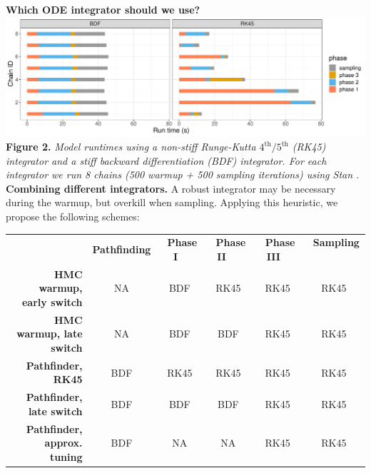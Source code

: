 \documentclass[21pt, custom, portrait, plainboxedsections]{sciposter}
\begin{document}
\begin{multicols}{3}
\textbf{Which ODE integrator should we use?} \\

\includegraphics[width = 14.5in]{../figures/phase_time_facet_4x12.pdf}
\textbf{Figure 2.} \textit{Model runtimes using a non-stiff Runge-Kutta $4^\text{th}/5^\text{th}$ (RK45) integrator and a stiff backward differentiation (BDF) integrator.
For each integrator we run 8 chains (500 warmup + 500 sampling iterations) using Stan \cite{Stan:2021}.} \\


\textbf{Combining different integrators.} A robust integrator may be necessary during the warmup, but overkill when sampling.
Applying this heuristic, we propose the following schemes:

\begin{center}
\renewcommand{\arraystretch}{1.5}
\begin{tabular}{r c c c c c}
  & \textbf{Pathfinding} & \ \textbf{Phase I} \ & \ \textbf{Phase II} \ \ & \ \textbf{Phase III} \ & \ \textbf{Sampling} \ \\
  \textbf{HMC warmup, early switch} & NA & \cellcolor{Melon} BDF & \cellcolor{SkyBlue} RK45 & \cellcolor{SkyBlue} RK45 & \cellcolor{SkyBlue} RK45 \\
  \textbf{HMC warmup, late switch} & NA & \cellcolor{Melon} BDF & \cellcolor{Melon} BDF &  \cellcolor{SkyBlue} RK45 & \cellcolor{SkyBlue} RK45 \\
  \hline
  \textbf{Pathfinder, RK45} & \cellcolor{Melon} BDF  & \cellcolor{SkyBlue} RK45 & \cellcolor{SkyBlue} RK45 & \cellcolor{SkyBlue} RK45 & \cellcolor{SkyBlue} RK45 \\
  \textbf{Pathfinder, late switch} & \cellcolor{Melon} BDF & \cellcolor{Melon} BDF & \cellcolor{Melon} BDF & \cellcolor{SkyBlue} RK45 & \cellcolor{SkyBlue} RK45 \\
  \textbf{Pathfinder, approx. tuning} & \cellcolor{Melon} BDF & NA & NA & \cellcolor{SkyBlue} RK45 & \cellcolor{SkyBlue} RK45
\end{tabular}
\end{center}


\end{multicols}
\end{document}
